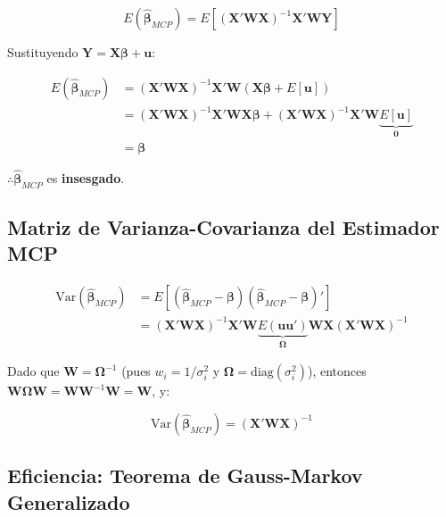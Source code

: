 \documentclass[12pt,a4paper]{article}
\begin{document}
\begin{equation}
E(\hat{\boldsymbol{\beta}}_{MCP}) = E\left[(\mathbf{X}'\mathbf{W}\mathbf{X})^{-1}\mathbf{X}'\mathbf{W}\mathbf{Y}\right]
\end{equation}

Sustituyendo $\mathbf{Y} = \mathbf{X}\boldsymbol{\beta} + \mathbf{u}$:

\begin{align}
E(\hat{\boldsymbol{\beta}}_{MCP}) &= (\mathbf{X}'\mathbf{W}\mathbf{X})^{-1}\mathbf{X}'\mathbf{W}(\mathbf{X}\boldsymbol{\beta} + E[\mathbf{u}]) \\
&= (\mathbf{X}'\mathbf{W}\mathbf{X})^{-1}\mathbf{X}'\mathbf{W}\mathbf{X}\boldsymbol{\beta} + (\mathbf{X}'\mathbf{W}\mathbf{X})^{-1}\mathbf{X}'\mathbf{W}\underbrace{E[\mathbf{u}]}_{\mathbf{0}} \\
&= \boldsymbol{\beta}
\end{align}

$\therefore \hat{\boldsymbol{\beta}}_{MCP}$ es \textbf{insesgado}.

\subsection{Matriz de Varianza-Covarianza del Estimador MCP}

\begin{align}
\text{Var}(\hat{\boldsymbol{\beta}}_{MCP}) &= E\left[(\hat{\boldsymbol{\beta}}_{MCP} - \boldsymbol{\beta})(\hat{\boldsymbol{\beta}}_{MCP} - \boldsymbol{\beta})'\right] \\[8pt]
&= (\mathbf{X}'\mathbf{W}\mathbf{X})^{-1}\mathbf{X}'\mathbf{W} \underbrace{E(\mathbf{u}\mathbf{u}')}_{\boldsymbol{\Omega}} \mathbf{W}\mathbf{X}(\mathbf{X}'\mathbf{W}\mathbf{X})^{-1}
\end{align}

Dado que $\mathbf{W} = \boldsymbol{\Omega}^{-1}$ (pues $w_i = 1/\sigma_i^2$ y $\boldsymbol{\Omega} = \text{diag}(\sigma_i^2)$), entonces $\mathbf{W}\boldsymbol{\Omega}\mathbf{W} = \mathbf{W}\mathbf{W}^{-1}\mathbf{W} = \mathbf{W}$, y:

\begin{equation}
\boxed{\text{Var}(\hat{\boldsymbol{\beta}}_{MCP}) = (\mathbf{X}'\mathbf{W}\mathbf{X})^{-1}}
\end{equation}

\subsection{Eficiencia: Teorema de Gauss-Markov Generalizado}
\end{document}
